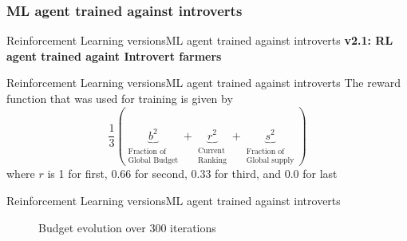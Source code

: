 \documentclass[10pt, aspectratio=169]{beamer}
\def\ab{Reinforcement Learning versions}
\def\abc{ML agent trained against introverts}
\begin{document}
\subsubsection{\abc}

\begin{frame}{\ab}{\abc}
  \centering
  \textbf{v2.1: RL agent trained againt Introvert farmers}
\end{frame}

\begin{frame}{\ab}{\abc}
  The reward function that was used for training is given by
\begin{equation}
    \frac{1}{3}(\underbrace{b^2}_{\substack{\text{Fraction of}\\\text{Global Budget}}} + \underbrace{r^2}_{\substack{\text{Current}\\\text{Ranking}}} + \underbrace{s^2}_{\substack{\text{Fraction of}\\\text{Global supply}}})
\end{equation}
where $r$ is 1 for first, $0.66$ for second, $0.33$ for third, and
$0.0$ for last
\end{frame}


\begin{frame}{\ab}{\abc}
\begin{figure}[H]
    \centering
    \caption{Budget evolution over 300 iterations}
    \label{fig:budget MLvsIntros}
\end{figure}
\end{frame}
\end{document}
